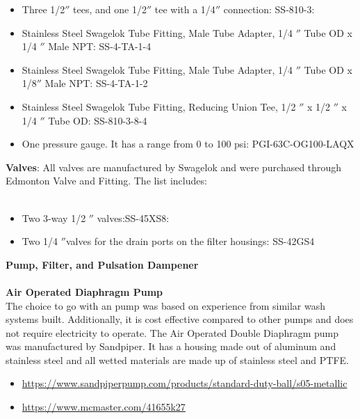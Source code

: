 \begin{itemize}
\item Three   1/2$''$ tees, and one  1/2$''$ tee with a 1/4$''$ connection: SS-810-3: 
\end{itemize}

\begin{itemize}
\item Stainless Steel Swagelok Tube Fitting, Male Tube Adapter, 1/4 $''$ Tube OD x 1/4 $''$ Male NPT: SS-4-TA-1-4
\end{itemize}

\begin{itemize}
\item Stainless Steel Swagelok Tube Fitting, Male Tube Adapter, 1/4 $''$  Tube OD x 1/8$''$ Male NPT: SS-4-TA-1-2 
\end{itemize}

\begin{itemize}
\item Stainless Steel Swagelok Tube Fitting, Reducing Union Tee, 1/2 $''$  x 1/2 $''$  x 1/4 $''$ Tube OD: SS-810-3-8-4
\end{itemize}

\begin{itemize}
\item One pressure gauge. It has a range from 0 to 100 psi: PGI-63C-OG100-LAQX
\end{itemize} 
\textbf{Valves}: All valves are manufactured by Swagelok and were purchased through Edmonton Valve and Fitting. The list includes:\\
\\
\begin{itemize}
\item Two 3-way 1/2 $''$ valves:SS-45XS8: 
\end{itemize}

\begin{itemize}
\item Two 1/4 $''$valves for the drain ports on the filter housings: SS-42GS4
\end{itemize} 
\textbf{Pump, Filter, and Pulsation Dampener}\\
\\
\textbf{Air Operated Diaphragm Pump}\\
The choice to go with an pump was based on experience from similar wash systems built. Additionally, it is cost effective compared to other pumps and does not require electricity to operate. The Air Operated Double Diaphragm  pump was manufactured by Sandpiper. It has a housing made out of aluminum and stainless steel and all wetted materials are made up of stainless steel and PTFE. \\
\begin{itemize}
\item \url{https://www.sandpiperpump.com/products/standard-duty-ball/s05-metallic}
\item \url{https://www.mcmaster.com/41655k27}\\
\end{itemize}

